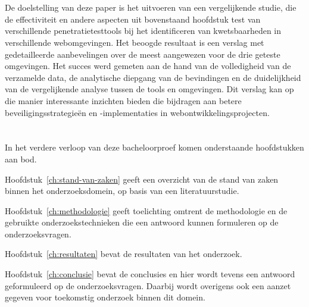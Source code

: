 \section{}%
\label{sec:onderzoeksdoelstelling}
De doelstelling van deze paper is het uitvoeren van een vergelijkende studie, die de effectiviteit en andere aspecten uit bovenstaand hoofdstuk 
test van verschillende penetratietesttools bij het identificeren van kwetsbaarheden in verschillende webomgevingen.
Het beoogde resultaat is een verslag met gedetailleerde aanbevelingen over de meest aangewezen voor de drie geteste 
omgevingen. Het succes werd gemeten aan de hand van de volledigheid van de verzamelde data, de analytische diepgang van de bevindingen 
en de duidelijkheid van de vergelijkende analyse tussen de tools en omgevingen. Dit verslag kan op die manier interessante inzichten bieden die 
bijdragen aan betere beveiligingsstrategieën en -implementaties in webontwikkelingsprojecten.
\section{}%
\label{sec:opzet-bachelorproef}


In het verdere verloop van deze bacheloorproef komen onderstaande hoofdstukken aan bod.

Hoofdstuk~\ref{ch:stand-van-zaken} geeft een overzicht van de stand van zaken binnen het onderzoeksdomein, op basis van een literatuurstudie.

Hoofdstuk~\ref{ch:methodologie} geeft toelichting omtrent de methodologie en de gebruikte onderzoekstechnieken die een antwoord kunnen formuleren op de onderzoeksvragen.

Hoofdstuk~\ref{ch:resultaten} bevat de resultaten van het onderzoek.

Hoofdstuk~\ref{ch:conclusie} bevat de conclusies en hier wordt tevens een antwoord geformuleerd op de onderzoeksvragen. Daarbij wordt overigens ook een aanzet gegeven voor toekomstig onderzoek binnen dit domein.